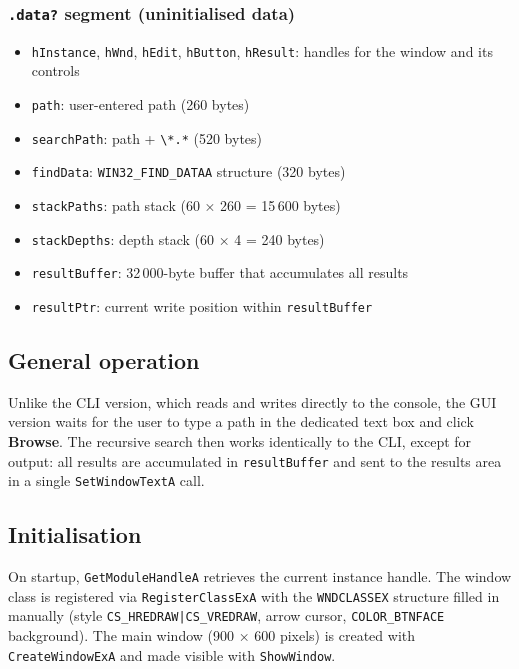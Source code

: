 \documentclass[12pt,a4paper]{article}
\begin{document}
\subsubsection{\texttt{.data?} segment (uninitialised data)}

\begin{itemize}
  \item \texttt{hInstance}, \texttt{hWnd}, \texttt{hEdit}, \texttt{hButton}, \texttt{hResult}: handles for the window and its controls
  \item \texttt{path}: user-entered path (260 bytes)
  \item \texttt{searchPath}: path + \texttt{\textbackslash{}*.*} (520 bytes)
  \item \texttt{findData}: \texttt{WIN32\_FIND\_DATAA} structure (320 bytes)
  \item \texttt{stackPaths}: path stack (60 × 260 = 15\,600 bytes)
  \item \texttt{stackDepths}: depth stack (60 × 4 = 240 bytes)
  \item \texttt{resultBuffer}: 32\,000-byte buffer that accumulates all results
  \item \texttt{resultPtr}: current write position within \texttt{resultBuffer}
\end{itemize}

\subsection{General operation}

Unlike the CLI version, which reads and writes directly to the console, the GUI version waits for the user to type a path in the dedicated text box and click \textbf{Browse}. The recursive search then works identically to the CLI, except for output: all results are accumulated in \texttt{resultBuffer} and sent to the results area in a single \texttt{SetWindowTextA} call.

\subsection{Initialisation}

On startup, \texttt{GetModuleHandleA} retrieves the current instance handle. The window class is registered via \texttt{RegisterClassExA} with the \texttt{WNDCLASSEX} structure filled in manually (style \texttt{CS\_HREDRAW|CS\_VREDRAW}, arrow cursor, \texttt{COLOR\_BTNFACE} background). The main window (900 × 600 pixels) is created with \texttt{CreateWindowExA} and made visible with \texttt{ShowWindow}.
\end{document}
